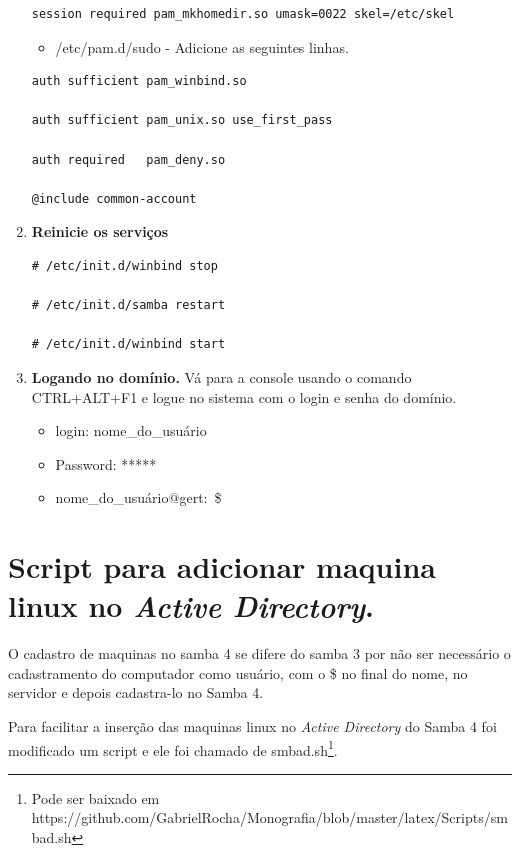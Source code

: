 \begin{enumerate}
\begin{lstlisting}
session required pam_mkhomedir.so umask=0022 skel=/etc/skel
		\end{lstlisting}

		\begin{itemize}
			\item {/etc/pam.d/sudo} - Adicione as seguintes linhas.\\
		\end{itemize}

		\begin{lstlisting}
auth sufficient pam_winbind.so

auth sufficient pam_unix.so use_first_pass

auth required   pam_deny.so

@include common-account
		\end{lstlisting}

	\item \textbf{Reinicie os serviços}\\
		\begin{lstlisting}
# /etc/init.d/winbind stop

# /etc/init.d/samba restart
			
# /etc/init.d/winbind start
		\end{lstlisting}

	\item \textbf{Logando no domínio.}
		Vá para a console usando o comando CTRL+ALT+F1 e logue no sistema com o login e senha do domínio.

		\begin{itemize}
			\item {login: nome\_do\_usuário}
			\item {Password: *****}
			\item {nome\_do\_usuário$@$gert:~\$}
		\end{itemize}

\end{enumerate}

\section{Script para adicionar maquina linux no \textit{Active Directory}.}

O cadastro de maquinas no samba 4 se difere do samba 3 por não ser necessário o cadastramento do computador como usuário, com o \$ no final do nome, no servidor e depois cadastra-lo no Samba 4.

Para facilitar a inserção das maquinas linux no \textit{Active Directory} do Samba 4 foi modificado um script e ele foi chamado de smbad.sh\footnote[4]{Pode ser baixado em https://github.com/GabrielRocha/Monografia/blob/master/latex/Scripts/smbad.sh}. 

